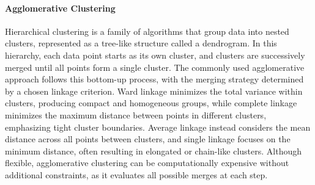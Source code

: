 \paragraph{Agglomerative Clustering}
\label{sec:background_ml_ac}
Hierarchical clustering is a family of algorithms that group data into nested clusters, represented as a tree-like structure called a dendrogram. In this hierarchy, each data point starts as its own cluster, and clusters are successively merged until all points form a single cluster. The commonly used agglomerative approach follows this bottom-up process, with the merging strategy determined by a chosen linkage criterion. Ward linkage minimizes the total variance within clusters, producing compact and homogeneous groups, while complete linkage minimizes the maximum distance between points in different clusters, emphasizing tight cluster boundaries. Average linkage instead considers the mean distance across all points between clusters, and single linkage focuses on the minimum distance, often resulting in elongated or chain-like clusters. Although flexible, agglomerative clustering can be computationally expensive without additional constraints, as it evaluates all possible merges at each step.

